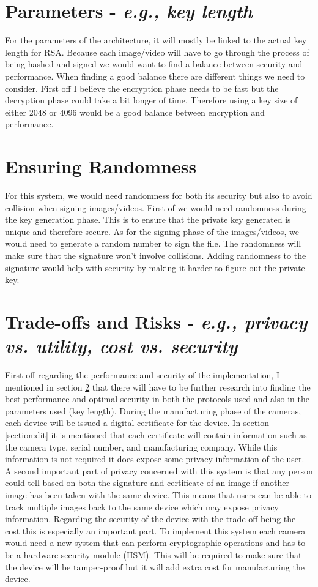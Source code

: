 \documentclass[9pt]{extarticle}
\begin{document}
\section{Parameters - \textit{e.g., key length}}
For the parameters of the architecture, it will mostly be linked to the actual key length for RSA. Because each image/video will have to go through the process of being hashed and signed we would want to find a balance between security and performance. When finding a good balance there are different things we need to consider. First off I believe the encryption phase needs to be fast but the decryption phase could take a bit longer of time. Therefore using a key size of either 2048 or 4096 would be a good balance between encryption and performance.

\section{Ensuring Randomness} \label{section:er}
For this system, we would need randomness for both its security but also to avoid collision when signing images/videos. First of we would need randomness during the key generation phase. This is to ensure that the private key generated is unique and therefore secure. As for the signing phase of the images/videos, we would need to generate a random number to sign the file. The randomness will make sure that the signature won't involve collisions. Adding randomness to the signature would help with security by making it harder to figure out the private key.

\section{Trade-offs and Risks - \textit{e.g., privacy vs. utility, cost vs. security}}
First off regarding the performance and security of the implementation, I mentioned in section \ref{section:er} that there will have to be further research into finding the best performance and optimal security in both the protocols used and also in the parameters used (key length). During the manufacturing phase of the cameras, each device will be issued a digital certificate for the device. In section \ref{section:dit} it is mentioned that each certificate will contain information such as the camera type, serial number, and manufacturing company. While this information is not required it does expose some privacy information of the user. A second important part of privacy concerned with this system is that any person could tell based on both the signature and certificate of an image if another image has been taken with the same device. This means that users can be able to track multiple images back to the same device which may expose privacy information. Regarding the security of the device with the trade-off being the cost this is especially an important part. To implement this system each camera would need a new system that can perform cryptographic operations and has to be a hardware security module (HSM). This will be required to make sure that the device will be tamper-proof but it will add extra cost for manufacturing the device.
\end{document}
